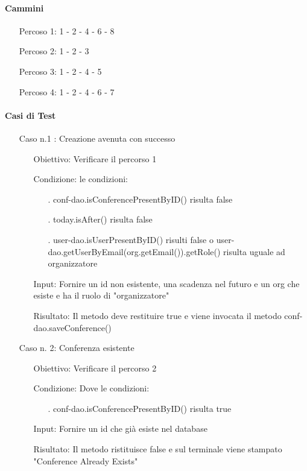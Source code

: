 \paragraph{Cammini}
\begin{itemize}
\item[Percoso 1: ] 1 - 2 - 4 - 6 - 8
\item[Percoso 2: ] 1 - 2 - 3 
\item[Percoso 3: ] 1 - 2 - 4 - 5
\item[Percoso 4: ] 1 - 2 - 4 - 6 - 7
\end{itemize}
\paragraph{Casi di Test}
\begin{itemize}
\item[Caso n.1 :] Creazione avenuta con successo
\begin{itemize}
\item[Obiettivo:] Verificare il percorso 1
\item[Condizione:] le condizioni:
\begin{itemize}
\item[.] conf-dao.isConferencePresentByID() risulta false
\item[.] today.isAfter() risulta false
\item[.] user-dao.isUserPresentByID() risulti false o user-dao.getUserByEmail(org.getEmail()).getRole() risulta uguale ad organizzatore
\end{itemize}
\item[Input:] Fornire un id non esistente, una scadenza nel futuro e un org che esiste e ha il ruolo di "organizzatore"
\item[Risultato:] Il metodo deve restituire true e viene invocata il metodo conf-dao.saveConference()
\end{itemize}
\item[Caso n. 2:] Conferenza esistente
\begin{itemize}
\item[Obiettivo:]  Verificare il percorso 2
\item[Condizione:]  Dove le condizioni:
\begin{itemize}
\item[.] conf-dao.isConferencePresentByID() risulta true
\end{itemize}
\item[Input:] Fornire un id che già esiste nel database
\item[Risultato:] Il metodo ristituisce false e sul terminale viene stampato "Conference Already Exists"

\end{itemize}
\end{itemize}
